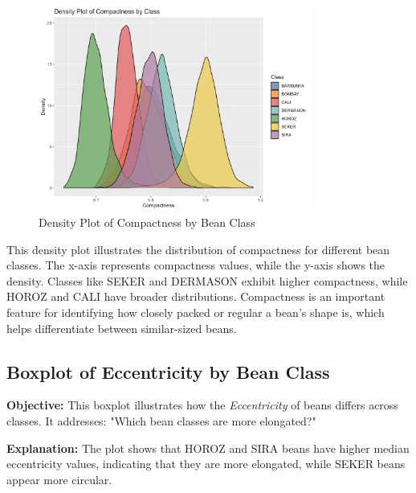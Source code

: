 \documentclass[a4paper,12pt]{article}
\begin{document}
\begin{figure}[H]
    \centering
    \includegraphics[width=0.8\textwidth]{graphs/density_compactness.png}
    \caption{Density Plot of Compactness by Bean Class}
    \label{fig:density_compactness}
\end{figure}
This density plot illustrates the distribution of compactness for different bean classes. The x-axis represents compactness values, while the y-axis shows the density. Classes like SEKER and DERMASON exhibit higher compactness, while HOROZ and CALI have broader distributions. Compactness is an important feature for identifying how closely packed or regular a bean's shape is, which helps differentiate between similar-sized beans.
\newpage

\subsection{Boxplot of Eccentricity by Bean Class}
\noindent\textbf{Objective:} This boxplot illustrates how the \textit{Eccentricity} of beans differs across classes. It addresses: "Which bean classes are more elongated?"

\noindent\textbf{Explanation:} The plot shows that HOROZ and SIRA beans have higher median eccentricity values, indicating that they are more elongated, while SEKER beans appear more circular.
\end{document}
